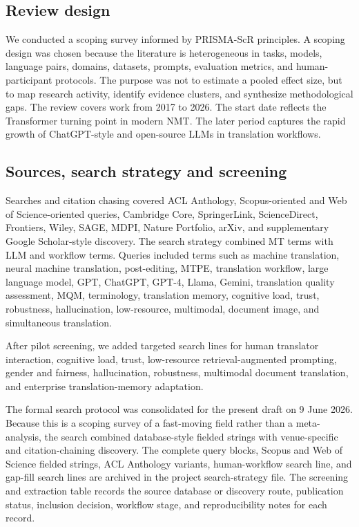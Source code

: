 \documentclass[11pt]{article}
\begin{document}
\subsection{Review design}
We conducted a scoping survey informed by PRISMA-ScR principles. A scoping design was chosen because the literature is heterogeneous in tasks, models, language pairs, domains, datasets, prompts, evaluation metrics, and human-participant protocols. The purpose was not to estimate a pooled effect size, but to map research activity, identify evidence clusters, and synthesize methodological gaps. The review covers work from 2017 to 2026. The start date reflects the Transformer turning point in modern NMT. The later period captures the rapid growth of ChatGPT-style and open-source LLMs in translation workflows.

\subsection{Sources, search strategy and screening}
Searches and citation chasing covered ACL Anthology, Scopus-oriented and Web of Science-oriented queries, Cambridge Core, SpringerLink, ScienceDirect, Frontiers, Wiley, SAGE, MDPI, Nature Portfolio, arXiv, and supplementary Google Scholar-style discovery. The search strategy combined MT terms with LLM and workflow terms. Queries included terms such as machine translation, neural machine translation, post-editing, MTPE, translation workflow, large language model, GPT, ChatGPT, GPT-4, Llama, Gemini, translation quality assessment, MQM, terminology, translation memory, cognitive load, trust, robustness, hallucination, low-resource, multimodal, document image, and simultaneous translation.

After pilot screening, we added targeted search lines for human translator interaction, cognitive load, trust, low-resource retrieval-augmented prompting, gender and fairness, hallucination, robustness, multimodal document translation, and enterprise translation-memory adaptation.

The formal search protocol was consolidated for the present draft on 9 June 2026. Because this is a scoping survey of a fast-moving field rather than a meta-analysis, the search combined database-style fielded strings with venue-specific and citation-chaining discovery. The complete query blocks, Scopus and Web of Science fielded strings, ACL Anthology variants, human-workflow search line, and gap-fill search lines are archived in the project search-strategy file. The screening and extraction table records the source database or discovery route, publication status, inclusion decision, workflow stage, and reproducibility notes for each record.
\end{document}
